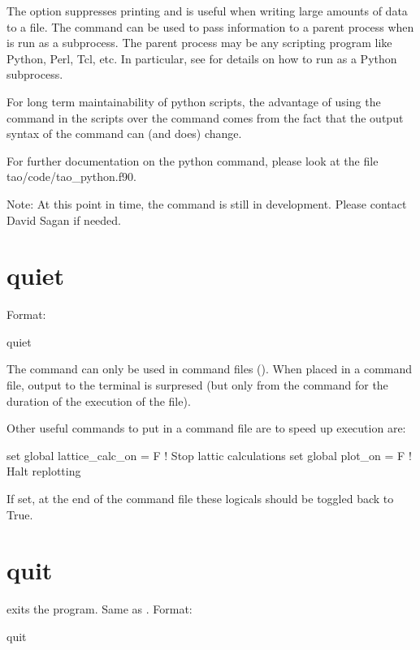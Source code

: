 The  option suppresses printing and is useful when writing large amounts of
data to a file.  The  command can be used to pass information to a parent
process when \tao is run as a subprocess.  The parent process may be any scripting program
like Python, Perl, Tcl, etc.  In particular, see  for details on how to run
\tao as a Python subprocess.

For long term maintainability of python scripts, the advantage of using the 
command in the scripts over the  command comes from the fact that the output
syntax of the  command can (and does) change.

For further documentation on the python command, please look at the file tao/code/tao_python.f90.

Note: At this point in time, the  command is still in development.  Please
contact David Sagan if needed.

\section{quiet}
\label{s:quiet}

Format:
\begin{example}
  quiet
\end{example}

The  command can only be used in command files ().
When placed in a command file, output to the terminal is surpresed (but
only from the  command for the duration of the execution of the file).

Other useful commands to put in a command file are to speed up execution are:
\begin{example}
  set global lattice_calc_on = F   ! Stop lattic calculations
  set global plot_on = F           ! Halt replotting
\end{example}
If set, at the end of the command file these logicals should be toggled back to True.

\section{quit}
\label{s:quit}

 exits the program. Same as .
Format:
\begin{example}
  quit
\end{example}

